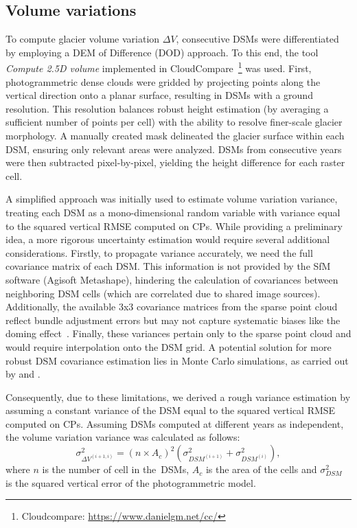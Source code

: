 \subsection{Volume variations}\label{sec:3:method_volumes}

To compute glacier volume variation $ \Delta V $, consecutive DSMs were differentiated
by employing a DEM of Difference (DOD) approach.
To this end, the tool \textit{Compute 2.5D volume} implemented in 
CloudCompare~\footnote{Cloudcompare: \url{https://www.danielgm.net/cc/}} was used.
First, photogrammetric dense clouds were gridded by projecting points along the vertical
direction onto a planar surface, resulting in DSMs with a  ground resolution.
This resolution balances robust height estimation (by averaging a sufficient number of points per cell) 
with the ability to resolve finer-scale glacier morphology.
A manually created mask delineated the glacier surface within each DSM, ensuring only 
relevant areas were analyzed.  
DSMs from consecutive years were then subtracted pixel-by-pixel, yielding the height 
difference for each raster cell.

A simplified approach was initially used to estimate volume variation variance, 
treating each DSM as a mono-dimensional random variable with variance equal to the squared 
vertical RMSE computed on CPs.  
While providing a preliminary idea, a more rigorous uncertainty estimation would require 
several additional considerations.
Firstly, to propagate variance accurately, we need the full covariance matrix of each DSM. 
This information is not provided by the SfM software (Agisoft Metashape), hindering the 
calculation of covariances between neighboring DSM cells (which are correlated due to 
shared image sources).
Additionally, the available 3x3 covariance matrices from the sparse point cloud reflect
bundle adjustment errors but may not capture systematic biases like the doming 
effect~\citep{James2014_mitigating, James2020_mitigating2}.
Finally, these variances pertain only to the sparse point cloud and would require 
interpolation onto the DSM grid.
A potential solution for more robust DSM covariance estimation lies in Monte Carlo simulations, 
as carried out by \cite{James2017_3duncertainty} and \cite{Roncella2021_montecarlo}.

Consequently, due to these limitations, we derived a rough variance estimation by
assuming a constant variance of the DSM equal to the squared vertical RMSE computed on CPs.
Assuming DSMs computed at different years as independent, the volume variation variance 
was calculated as follows:
\begin{equation}
    \sigma^2_{\Delta V^{(i+1,i)}}  = {(n \times A_c)}^2 \left( \sigma^2
    _{DSM^{(i+1)}} + \sigma^2_{DSM^{(i)}} \right),
    \label{eq:3:volVarProp}
\end{equation}
where $ n $ is the number of cell in the~DSMs, $A_c$ is the area of the cells
and $ \sigma^2 _{DSM}$ is the squared vertical error of the photogrammetric model.

